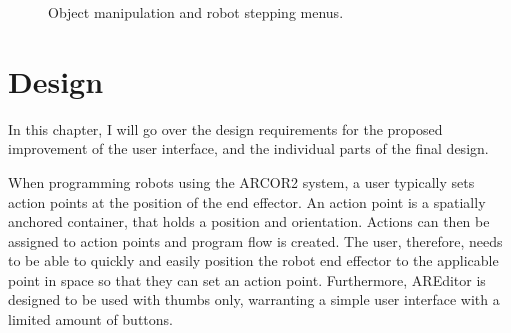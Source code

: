 \begin{figure}
    \centering
    \quad
    \caption{Object manipulation and robot stepping menus.}
    \label{manipulationandstepping}
\end{figure}

\chapter{Design}
In this chapter, I will go over the design requirements for the proposed improvement of the user interface, and the individual parts of the final design.

When programming robots using the ARCOR2 system, a user typically sets action points at the position of the end effector. An action point is a spatially anchored container, that holds a position and orientation. Actions can then be assigned to action points and program flow is created. The user, therefore, needs to be able to quickly and easily position the robot end effector to the applicable point in space so that they can set an action point. Furthermore, AREditor is designed to be used with thumbs only, warranting a simple user interface with a limited amount of buttons. 

